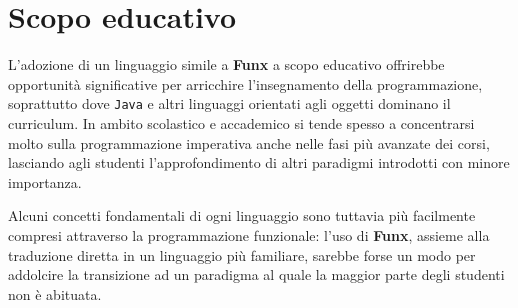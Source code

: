 \section{Scopo educativo}
\label{sec:6-3-educational-purpose}

L'adozione di un linguaggio simile a \textbf{Funx} a scopo educativo offrirebbe opportunità significative
per arricchire l'insegnamento della programmazione, soprattutto dove \texttt{Java} e altri linguaggi
orientati agli oggetti dominano il curriculum. In ambito scolastico e accademico si tende spesso a concentrarsi
molto sulla programmazione imperativa anche nelle fasi più avanzate dei corsi,
lasciando agli studenti l'approfondimento di altri paradigmi introdotti con minore importanza.

Alcuni concetti fondamentali di ogni linguaggio sono tuttavia più facilmente compresi attraverso la programmazione funzionale:
l'uso di \textbf{Funx}, assieme alla traduzione diretta in un linguaggio più familiare, sarebbe forse un modo per addolcire
la transizione ad un paradigma al quale la maggior parte degli studenti non è abituata.